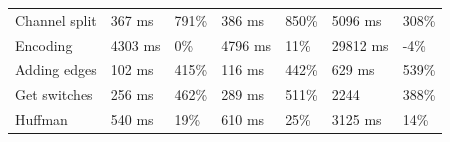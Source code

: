 \begin{table}[H]
\begin{tabular}{@{}lllllll@{}}
        Channel split           & 367 ms                                                                                    & 791\%                                                                          & 386 ms                                                                                     & 850\%                                                                         & 5096 ms                                                                                 & 308\%                                                                         \\
        Encoding                & 4303 ms                                                                                   & 0\%                                                                           & 4796 ms                                                                                    & 11\%                                                                          & 29812 ms                                                                                & -4\%                                                                          \\
        Adding edges            & 102 ms                                                                                    & 415\%                                                                          & 116 ms                                                                                     & 442\%                                                                         & 629 ms                                                                                  & 539\%                                                                         \\
        Get switches            & 256 ms                                                                                    & 462\%                                                                          & 289 ms                                                                                     & 511\%                                                                         & 2244                                                                                    & 388\%                                                                         \\
        Huffman                 & 540 ms                                                                                    & 19\%                                                                           & 610 ms                                                                                     & 25\%                                                                          & 3125 ms                                                                                 & 14\%                                                                          \\ \midrule

\end{tabular}
\end{table}
